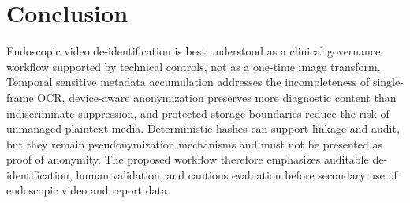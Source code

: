 \documentclass{article}
\begin{document}
\section{Conclusion}
Endoscopic video de-identification is best understood as a clinical governance
workflow supported by technical controls, not as a one-time image transform.
Temporal sensitive metadata accumulation addresses the incompleteness of
single-frame OCR, device-aware anonymization preserves more diagnostic content
than indiscriminate suppression, and protected storage boundaries reduce the
risk of unmanaged plaintext media. Deterministic hashes can support linkage and
audit, but they remain pseudonymization mechanisms and must not be presented as
proof of anonymity. The proposed workflow therefore emphasizes auditable
de-identification, human validation, and cautious evaluation before secondary
use of endoscopic video and report data.

\newpage


\end{document}
